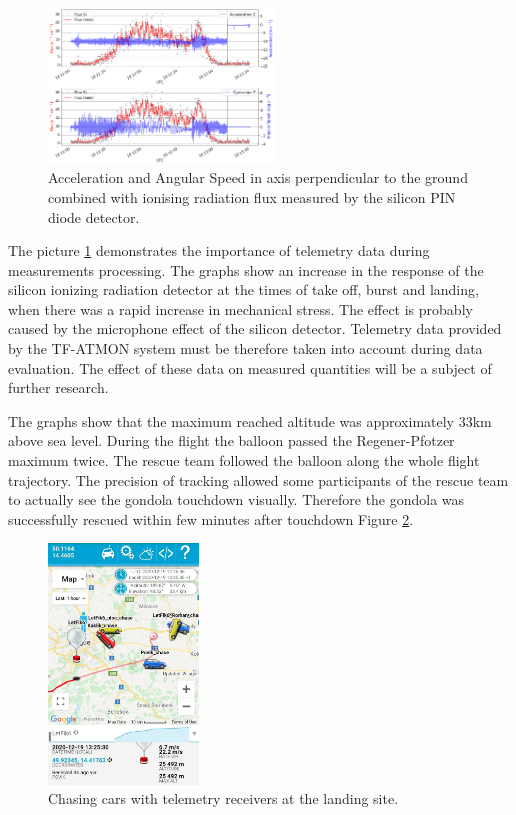 \documentclass{Rpd}
\begin{document}
\begin{center}
\begin{figure}%
	\centerline{\includegraphics[width=60mm]{img/FIK-6_metadada.png}}
	\caption{Acceleration and Angular Speed in axis perpendicular to the ground combined with ionising radiation flux measured by the silicon PIN diode detector. \label{FIK-6_telemetry}}
\end{figure}
\end{center}

The picture \ref{FIK-6_telemetry} demonstrates the importance of telemetry data during measurements processing. The graphs show an increase in the response of the silicon ionizing radiation detector at the times of take off, burst and landing, when there was a rapid increase in mechanical stress. The effect is probably caused by the microphone effect of the silicon detector. Telemetry data provided by the TF-ATMON system must be therefore taken into account during data evaluation. The effect of these data on measured quantities will be a subject of further research. 


The graphs show that the maximum reached altitude was approximately 33km above sea level. During the flight the balloon passed the Regener-Pfotzer maximum twice. The rescue team followed the balloon along the whole flight trajectory. The precision of tracking allowed some participants of the rescue team to actually see the gondola touchdown visually. Therefore the gondola was successfully rescued within few minutes after touchdown Figure \ref{FIK-6_rescue_team}.

\begin{center}
\begin{figure}%
	\centerline{\includegraphics[width=40mm]{img/FIK-6_rescue_team.png}}
	\caption{Chasing cars with telemetry receivers at the landing site. \label{FIK-6_rescue_team}}
\end{figure}
\end{center}
\end{document}
